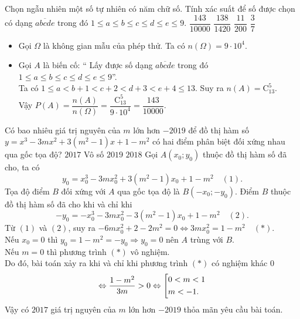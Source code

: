 \begin{ex}%
	Chọn ngẫu nhiên một số tự nhiên có năm chữ số. Tính xác suất để số được chọn có dạng $\overline{abcde}$ trong đó $1\leq a \leq b\leq c\leq d\leq e\leq 9$.
		\choice
	{\True $\dfrac{143}{10000}$}
	{$\dfrac{138}{1420}$}
	{$\dfrac{11}{200}$}
	{$\dfrac{3}{7}$}
	\loigiai
	{\begin{itemize}
			\item  Gọi $\Omega$ là không gian mẫu của phép thử. Ta có $n\left( \Omega \right)= 9\cdot 10^4$.
			\item Gọi $A$ là biến cố: `` Lấy được số dạng $\overline{abcde}$ trong đó $1\leq a \leq b\leq c\leq d\leq e\leq 9$''.\\
			Ta có $1\leq a < b+1<c+2<d+3<e+4 \leq 13.$ Suy ra $n(A)= \mathrm{C}_{13}^5$.\\
			Vậy $P(A)= \dfrac{n(A)}{n(\Omega)}= \dfrac{\mathrm{C}_{13}^5}{9\cdot 10^4}= \dfrac{143}{10000}$.
		\end{itemize}
		
	}
\end{ex}

\begin{ex}%
	Có bao nhiêu giá trị nguyên của $m$ lớn hơn $-2019$ để đồ thị hàm số $y=x^3-3mx^2+3(m^2-1)x+1-m^2$ có hai điểm phân biệt đối xứng nhau qua gốc tọa độ?
		\choice
	{\True $2017$}
	{Vô số}
	{$2019$}
	{$2018$}
	\loigiai
	{Gọi $A(x_0;y_0)$ thuộc đồ thị hàm số  đã cho, ta có 
		$$y_0=x_0^3-3mx_0^2+3(m^2-1)x_0+1-m^2 \quad (1).$$
	Tọa độ điểm $B$ đối xứng với $A$ qua gốc tọa độ là $B(-x_0;-y_0).$ Điểm $B$ thuộc đồ thị hàm số đã cho khi và chỉ khi 	$$-y_0=-x_0^3-3mx_0^2-3(m^2-1)x_0+1-m^2 \quad (2).$$
	Từ $(1)$ và $(2)$, suy ra $-6mx_0^2+2-2m^2=0 \Leftrightarrow 3mx_0^2=1-m^2\quad (*).$\\
	Nếu $x_0=0$ thì $y_0=1-m^2=-y_0 \Rightarrow y_0=0$ nên $A$ trùng với $B$.\\
	Nếu $m=0$ thì phương trình $(*)$ vô nghiệm.\\
	Do đó, bài toán xảy ra khi và chỉ khi phương trình $(*)$ có nghiệm khác $0 $ $$\Leftrightarrow \dfrac{1-m^2}{3m}>0
	\Leftrightarrow \left[\begin{aligned}& 0<m<1\\&m<-1.\end{aligned}\right. $$
	Vậy có $2017$ giá trị nguyên của $m$ lớn hơn $-2019$ thỏa mãn yêu cầu bài toán.
	}
\end{ex}

